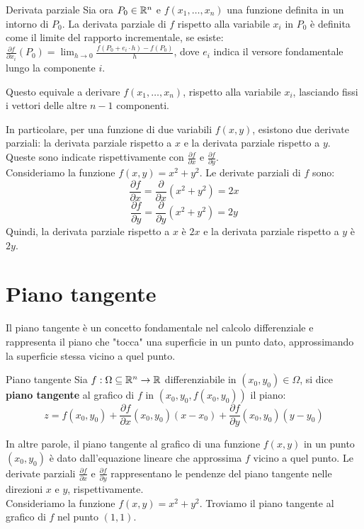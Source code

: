 \begin{definizione}{Derivata parziale}
  Sia ora $P_0 \in \mathbb{R}^n $ e $f(x_1, \dots, x_n)$ una funzione definita in un intorno di $P_0$. La derivata parziale di $f$ rispetto alla variabile $x_i$ in $P_0$ è definita come il limite del rapporto incrementale, se esiste: $
\frac{\partial f}{\partial x_i}(P_0) = \lim_{h \to 0} \frac{f(P_0+e_i\cdot h) - f(P_0)}{h}$, dove $e_i$ indica il versore fondamentale lungo la componente $i$.
\end{definizione}
Questo equivale a derivare $f(x_1,\dots, x_n)$, rispetto alla variabile $x_i$, lasciando fissi i vettori delle altre $n-1$ componenti.

In particolare, per una funzione di due variabili $f(x,y)$, esistono due derivate parziali: la derivata parziale rispetto a $x$ e la derivata parziale rispetto a $y$. Queste sono indicate rispettivamente con $\frac{\partial f}{\partial x}$ e $\frac{\partial f}{\partial y}$. \\
Consideriamo la funzione $f(x,y) = x^2 + y^2$. Le derivate parziali di $f$ sono:
\[
\frac{\partial f}{\partial x} = \frac{\partial}{\partial x}(x^2 + y^2) = 2x
\]
\[
\frac{\partial f}{\partial y} = \frac{\partial}{\partial y}(x^2 + y^2) = 2y
\]
Quindi, la derivata parziale rispetto a $x$ è $2x$ e la derivata parziale rispetto a $y$ è $2y$.\\

\section{Piano tangente}
Il piano tangente è un concetto fondamentale nel calcolo differenziale e rappresenta il piano che "tocca" una superficie in un punto dato, approssimando la superficie stessa vicino a quel punto.

\begin{definizione}{Piano tangente}
Sia $f:\Omega \subseteq \mathbb{R}^n \rightarrow \mathbb{R}$ differenziabile in $(x_0,y_0) \in \Omega$, si dice \textbf{piano tangente} al grafico di $f$ in $(x_0,y_0,f(x_0,y_0))$ il piano:
$$z=f(x_0,y_0)+\frac{\partial f}{\partial x}(x_0,y_0)(x-x_0)+\frac{\partial f}{\partial y}(x_0,y_0)(y-y_0)$$
\end{definizione}

In altre parole, il piano tangente al grafico di una funzione $f(x,y)$ in un punto $(x_0, y_0)$ è dato dall'equazione lineare che approssima $f$ vicino a quel punto. Le derivate parziali $\frac{\partial f}{\partial x}$ e $\frac{\partial f}{\partial y}$ rappresentano le pendenze del piano tangente nelle direzioni $x$ e $y$, rispettivamente.
\\
Consideriamo la funzione $f(x,y) = x^2 + y^2$. Troviamo il piano tangente al grafico di $f$ nel punto $(1,1)$.


